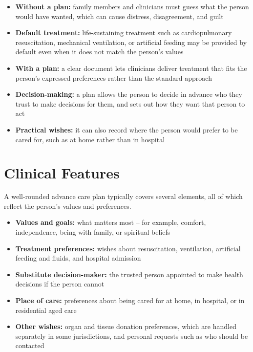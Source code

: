 \begin{itemize}
    \item \textbf{Without a plan:} family members and clinicians must guess what the person would have wanted, which can cause distress, disagreement, and guilt
    \item \textbf{Default treatment:} life-sustaining treatment such as cardiopulmonary resuscitation, mechanical ventilation, or artificial feeding may be provided by default even when it does not match the person's values
    \item \textbf{With a plan:} a clear document lets clinicians deliver treatment that fits the person's expressed preferences rather than the standard approach
    \item \textbf{Decision-making:} a plan allows the person to decide in advance who they trust to make decisions for them, and sets out how they want that person to act
    \item \textbf{Practical wishes:} it can also record where the person would prefer to be cared for, such as at home rather than in hospital
\end{itemize}

\section*{Clinical Features}
A well-rounded advance care plan typically covers several elements, all of which reflect the person's values and preferences.

\begin{itemize}
    \item \textbf{Values and goals:} what matters most -- for example, comfort, independence, being with family, or spiritual beliefs
    \item \textbf{Treatment preferences:} wishes about resuscitation, ventilation, artificial feeding and fluids, and hospital admission
    \item \textbf{Substitute decision-maker:} the trusted person appointed to make health decisions if the person cannot
    \item \textbf{Place of care:} preferences about being cared for at home, in hospital, or in residential aged care
    \item \textbf{Other wishes:} organ and tissue donation preferences, which are handled separately in some jurisdictions, and personal requests such as who should be contacted
\end{itemize}

